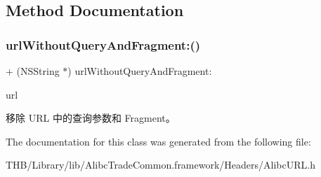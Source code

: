 \subsection{Method Documentation}
\mbox{\label{interface_alibc_u_r_l_af8b549ff1e1dfb5b236be3e3fd8d1dae}} 
\subsubsection{\texorpdfstring{url\+Without\+Query\+And\+Fragment\+:()}{urlWithoutQueryAndFragment:()}}
{\footnotesize\ttfamily + (N\+S\+String $\ast$) url\+Without\+Query\+And\+Fragment\+: \begin{DoxyParamCaption}\item[{(N\+S\+String $\ast$)}]{url }\end{DoxyParamCaption}}

移除 U\+RL 中的查询参数和 Fragment。 

The documentation for this class was generated from the following file\+:\begin{DoxyCompactItemize}
\item 
T\+H\+B/\+Library/lib/\+Alibc\+Trade\+Common.\+framework/\+Headers/Alibc\+U\+R\+L.\+h\end{DoxyCompactItemize}
